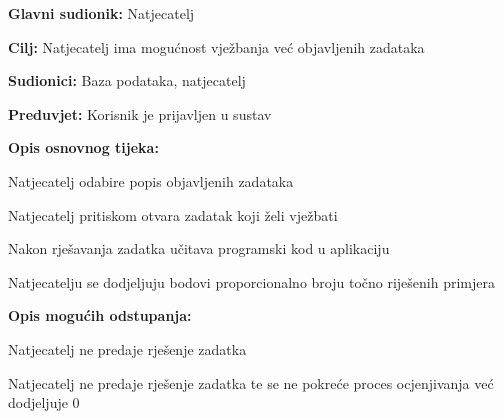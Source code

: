 					\noindent {}
					\begin{packed_item}
						
						\item \textbf{Glavni sudionik: }Natjecatelj
						\item  \textbf{Cilj:} Natjecatelj ima mogućnost vježbanja već objavljenih zadataka 
						\item  \textbf{Sudionici:} Baza podataka, natjecatelj
						\item  \textbf{Preduvjet:} Korisnik je prijavljen u sustav
						\item  \textbf{Opis osnovnog tijeka:}
						
						\item[] \begin{packed_enum}
							
							\item Natjecatelj odabire popis objavljenih zadataka
							\item Natjecatelj pritiskom otvara zadatak koji želi vježbati
							\item Nakon rješavanja zadatka učitava programski kod u aplikaciju
							\item Natjecatelju se dodjeljuju bodovi proporcionalno broju točno riješenih primjera 
							
						\end{packed_enum}
						
						\item  \textbf{Opis mogućih odstupanja:}
						
						\item[] \begin{packed_item}
							
							\item[2.a] Natjecatelj ne predaje rješenje zadatka
							\item[] \begin{packed_enum}
								
								\item Natjecatelj ne predaje rješenje zadatka te se ne pokreće proces ocjenjivanja već dodjeljuje 0 
								
							\end{packed_enum}
						\end{packed_item}
					\end{packed_item}
					
